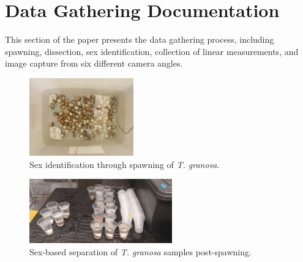 %
%
%                 

\chapter{Data Gathering Documentation}
\label{sec:appendixc}



%

This section of the paper presents the data gathering process, including spawning, dissection, sex identification, collection of linear measurements, and image capture from six different camera angles.


\begin{figure}[!htbp]
	\centering
	\includegraphics[width=0.4\textwidth, angle=90]{figures/spawning.jpg}
	\caption{Sex identification through spawning of \textit{T. granosa}.}
\end{figure}

\begin{figure}[!htbp]
	\centering
	\includegraphics[width=0.55\textwidth]{figures/spawning_separated.jpg}
	\caption{Sex-based separation of \textit{T. granosa} samples post-spawning.}
\end{figure}

